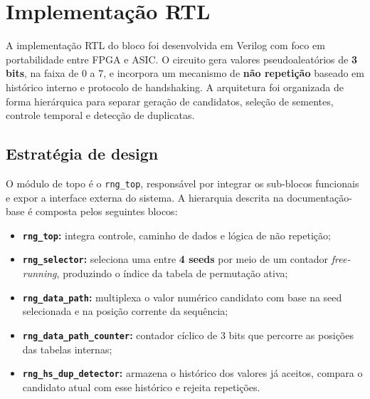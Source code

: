 \documentclass[12pt,a4paper]{article}
\begin{document}
	\clearpage
	
	
	\section{Implementação RTL}
	
	A implementação RTL do bloco foi desenvolvida em Verilog com foco em portabilidade entre FPGA e ASIC. O circuito gera valores pseudoaleatórios de \textbf{3 bits}, na faixa de 0 a 7, e incorpora um mecanismo de \textbf{não repetição} baseado em histórico interno e protocolo de handshaking. A arquitetura foi organizada de forma hierárquica para separar geração de candidatos, seleção de sementes, controle temporal e detecção de duplicatas.
	
	\subsection*{Estratégia de design}
	
	O módulo de topo é o \texttt{rng\_top}, responsável por integrar os sub-blocos funcionais e expor a interface externa do sistema. A hierarquia descrita na documentação-base é composta pelos seguintes blocos:
	
	\vspace{0.5cm}
	\begin{itemize}[leftmargin=1.4em]
		\item \textbf{\texttt{rng\_top}:} integra controle, caminho de dados e lógica de não repetição;
		\item \textbf{\texttt{rng\_selector}:} seleciona uma entre \textbf{4 seeds} por meio de um contador \textit{free-running}, produzindo o índice da tabela de permutação ativa;
		\item \textbf{\texttt{rng\_data\_path}:} multiplexa o valor numérico candidato com base na seed selecionada e na posição corrente da sequência;
		\item \textbf{\texttt{rng\_data\_path\_counter}:} contador cíclico de 3 bits que percorre as posições das tabelas internas;
		\item \textbf{\texttt{rng\_hs\_dup\_detector}:} armazena o histórico dos valores já aceitos, compara o candidato atual com esse histórico e rejeita repetições.
	\end{itemize}
	
\end{document}
